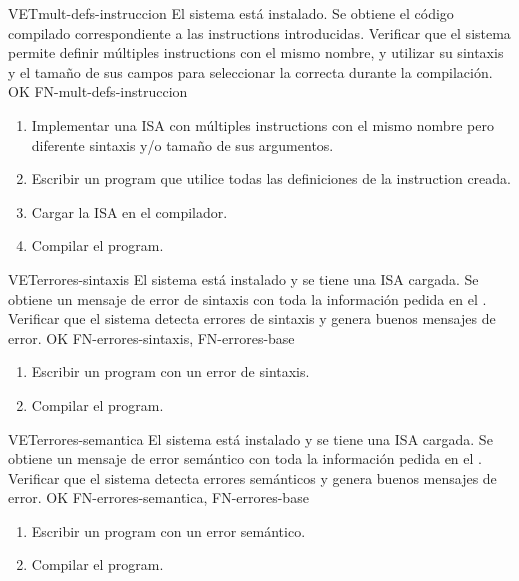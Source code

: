 \begin{testCase}{VET}{mult-defs-instruccion}
    {El sistema está instalado.} %
    {Se obtiene el código compilado correspondiente a las \glspl{instruction} introducidas.} %
    {Verificar que el sistema permite definir múltiples \glspl{instruction} con
    el mismo nombre, y utilizar su sintaxis y el tamaño de sus campos para
    seleccionar la correcta durante la compilación.} %
    {OK} %
    {FN-mult-defs-instruccion} %
    \begin{enumerate}[leftmargin=*, topsep=0pt, noitemsep] %
        \item Implementar una \gls{ISA} con múltiples \glspl{instruction} con el
        mismo nombre pero diferente sintaxis y/o tamaño de sus argumentos.
        \item Escribir un \gls{program} que utilice todas las definiciones de la
        \gls{instruction} creada.
        \item Cargar la \gls{ISA} en el compilador.
        \item Compilar el \gls{program}.
    \end{enumerate}
\end{testCase}

\begin{testCase}{VET}{errores-sintaxis}
    {El sistema está instalado y se tiene una \gls{ISA} cargada.} %
    {Se obtiene un mensaje de error de sintaxis con toda la información pedida en el .} %
    {Verificar que el sistema detecta errores de sintaxis y genera buenos mensajes de error.} %
    {OK} %
    {FN-errores-sintaxis, FN-errores-base} %
    \begin{enumerate}[leftmargin=*, topsep=0pt, noitemsep] %
        \item Escribir un \gls{program} con un error de sintaxis.
        \item Compilar el \gls{program}.
    \end{enumerate}
\end{testCase}

\begin{testCase}{VET}{errores-semantica}
    {El sistema está instalado y se tiene una \gls{ISA} cargada.} %
    {Se obtiene un mensaje de error semántico con toda la información pedida en el .} %
    {Verificar que el sistema detecta errores semánticos y genera buenos mensajes de error.} %
    {OK} %
    {FN-errores-semantica, FN-errores-base} %
    \begin{enumerate}[leftmargin=*, topsep=0pt, noitemsep] %
        \item Escribir un \gls{program} con un error semántico.
        \item Compilar el \gls{program}.
    \end{enumerate}
\end{testCase}

